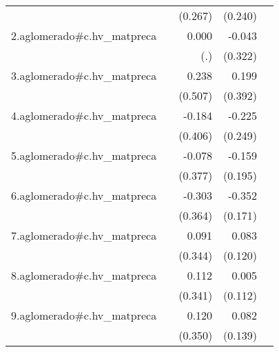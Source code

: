{\begin{longtable}{l*{4}{D{.}{.}{-1}}}
            &                     &     (0.267)         &     (0.240)         &                     \\
\addlinespace
2.aglomerado#c.hv\_matpreca&                     &       0.000         &      -0.043         &                     \\
            &                     &         (.)         &     (0.322)         &                     \\
\addlinespace
3.aglomerado#c.hv\_matpreca&                     &       0.238         &       0.199         &                     \\
            &                     &     (0.507)         &     (0.392)         &                     \\
\addlinespace
4.aglomerado#c.hv\_matpreca&                     &      -0.184         &      -0.225         &                     \\
            &                     &     (0.406)         &     (0.249)         &                     \\
\addlinespace
5.aglomerado#c.hv\_matpreca&                     &      -0.078         &      -0.159         &                     \\
            &                     &     (0.377)         &     (0.195)         &                     \\
\addlinespace
6.aglomerado#c.hv\_matpreca&                     &      -0.303         &      -0.352\sym{*}  &                     \\
            &                     &     (0.364)         &     (0.171)         &                     \\
\addlinespace
7.aglomerado#c.hv\_matpreca&                     &       0.091         &       0.083         &                     \\
            &                     &     (0.344)         &     (0.120)         &                     \\
\addlinespace
8.aglomerado#c.hv\_matpreca&                     &       0.112         &       0.005         &                     \\
            &                     &     (0.341)         &     (0.112)         &                     \\
\addlinespace
9.aglomerado#c.hv\_matpreca&                     &       0.120         &       0.082         &                     \\
            &                     &     (0.350)         &     (0.139)         &                     \\

\end{longtable}}
